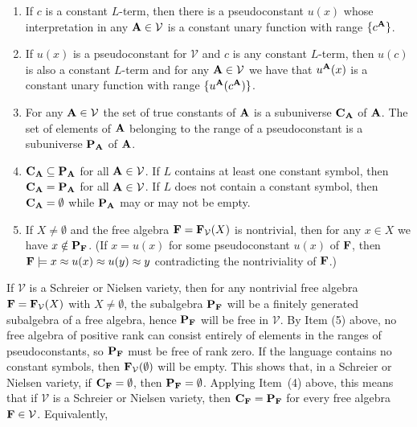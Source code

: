 \documentclass[12pt]{amsart}
\theoremstyle{definition}
\numberwithin{equation}{section}
\newcommand{\m}[1]{{\mathbf{\uppercase{#1}}}}
\begin{document}
\begin{enumerate}
\item[(1)] If $c$ is a constant $L$-term, then
  there is a pseudoconstant $u(x)$ whose
  interpretation in any $\m a\in {\mathcal V}$
  is a constant unary function with range $\{c^{\m a}\}$.
  \smallskip

\item[(2)] If $u(x)$ is 
  a pseudoconstant for $\mathcal V$
  and $c$ is any constant $L$-term,
  then $u(c)$ is also a constant $L$-term
and for any $\m a\in {\mathcal V}$   we have that
$u^{\m a}(x)$ is a constant unary function
with range $\{u^{\m a}(c^{\m a})\}$.
  \smallskip

\item[(3)] For any $\m a\in {\mathcal V}$ the set of
true constants of $\m a$
is a subuniverse $\m c_{\m a}$ of $\m a$.
The set of elements of $\m a$ belonging to the range
of a pseudoconstant is
a subuniverse $\m p_{\m a}$ of $\m a$.
  \smallskip

\item[(4)]
$\m c_{\m a}\subseteq \m p_{\m a}$ for all $\m a\in {\mathcal V}$.
  If $L$ contains at least one constant symbol, then
$\m c_{\m a}=\m p_{\m a}$  for all $\m a\in {\mathcal V}$.
  If $L$ does not contain a constant symbol, then
  $\m c_{\m a}=\emptyset$ while
  $\m p_{\m a}$  may or may not be empty.
  \smallskip

\item[(5)]
  If $X\neq \emptyset$ and
  the free algebra $\m f=\m f_{\mathcal V}(X)$ is nontrivial,
  then for any $x\in X$ we have
  $x\notin \m p_{\m f}$.
  (If $x=u(x)$ for some pseudoconstant $u(x)$ of $\m f$, then
  $\m f\models x\approx u(x)\approx u(y)\approx y$ contradicting
  the nontriviality of $\m f$.)
\end{enumerate}
  \smallskip


If $\mathcal V$ is a Schreier or Nielsen variety, then
for any nontrivial free algebra $\m f = \m f_{\mathcal V}(X)$ with
$X\neq\emptyset$,
the subalgebra $\m p_{\m f}$ will be a finitely generated
subalgebra of a free algebra, hence $\m p_{\m f}$ will be free
in $\mathcal{V}$.
By Item (5) above, no free algebra of positive rank
can consist entirely of elements in
the ranges of pseudoconstants,
so $\m p_{\m f}$ must be free of rank zero.
If the language contains no constant symbols,
then $\m f_{\mathcal V}(\emptyset)$ will be empty.
This shows that, in a Schreier or Nielsen variety,
if $\m c_{\m f}=\emptyset$, then $\m p_{\m f}=\emptyset$.
Applying Item~(4) above, this means that if $\mathcal{V}$
is a Schreier or Nielsen variety, then $\m c_{\m f}=\m p_{\m f}$
for every free algebra $\m f\in \mathcal{V}$.
Equivalently, 
\end{document}
